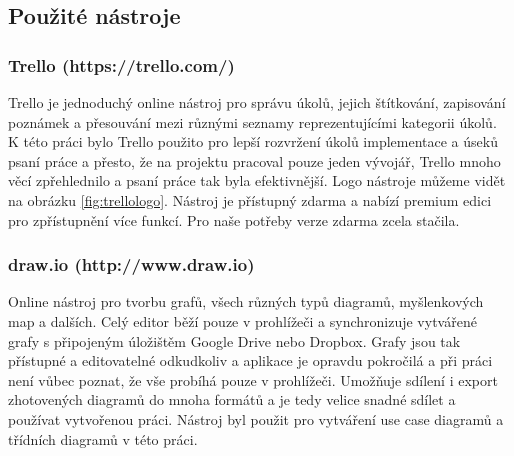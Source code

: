 \documentclass[czech,master,public,dept460,male,java,cpdeclaration]{diploma}
\begin{document}
\subsection{Použité nástroje}
\subsubsection{Trello (https://trello.com/)}
Trello je jednoduchý online nástroj pro správu úkolů, jejich štítkování, zapisování poznámek a přesouvání
mezi různými seznamy reprezentujícími kategorii úkolů. K této práci bylo Trello použito pro lepší
rozvržení úkolů implementace a úseků psaní práce a přesto, že na projektu pracoval pouze jeden vývojář,
Trello mnoho věcí zpřehlednilo a psaní práce tak byla efektivnější. Logo nástroje můžeme vidět
na obrázku \ref{fig:trellologo}. Nástroj je přístupný zdarma a nabízí premium edici pro zpřístupnění
více funkcí. Pro naše potřeby verze zdarma zcela stačila.

\subsubsection{draw.io (http://www.draw.io)}
Online nástroj pro tvorbu grafů, všech různých typů diagramů, myšlenkových map a dalších.
Celý editor běží pouze v prohlížeči a synchronizuje vytvářené grafy s připojeným úložištěm
Google Drive nebo Dropbox. Grafy jsou tak přístupné  a editovatelné odkudkoliv a aplikace
je opravdu pokročilá a při práci není vůbec poznat, že vše probíhá pouze v prohlížeči.
Umožňuje sdílení i export zhotovených diagramů do mnoha formátů a je tedy velice snadné
sdílet a používat vytvořenou práci.
Nástroj byl použit pro vytváření use case diagramů a třídních diagramů v této práci.
\end{document}
